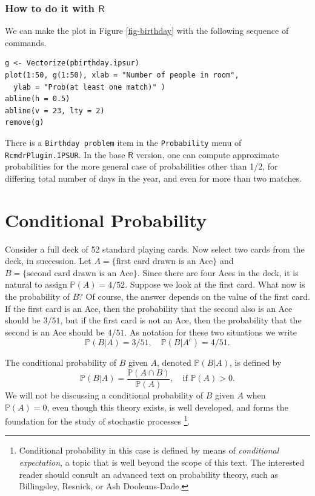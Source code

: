 \documentclass[captions=tableheading]{scrbook}
\begin{document}
\subsubsection{How to do it with \(\mathsf{R}\)}
\label{sec-4-5-2-3}


We can make the plot in Figure \ref{fig-birthday} with the following sequence of commands.


\lstset{language=R}
\begin{lstlisting}
g <- Vectorize(pbirthday.ipsur)
plot(1:50, g(1:50), xlab = "Number of people in room", 
  ylab = "Prob(at least one match)" )
abline(h = 0.5)
abline(v = 23, lty = 2)
remove(g)
\end{lstlisting}

There is a \texttt{Birthday problem} item in the \texttt{Probability} menu of \texttt{RcmdrPlugin.IPSUR}. In the base \(\mathsf{R}\) version, one can compute approximate probabilities for the more general case of probabilities other than 1/2, for differing total number of days in the year, and even for more than two matches.
\section{Conditional Probability}
\label{sec-4-6}
\label{sec-Conditional-Probability}


Consider a full deck of 52 standard playing cards. Now select two cards from the deck, in succession. Let \( A = \{ \mbox{first card drawn is an Ace} \} \) and \( B = \{ \mbox{second card drawn is an Ace} \} \). Since there are four Aces in the deck, it is natural to assign \( \mathbb{P}(A) = 4/52 \). Suppose we look at the first card. What now is the probability of \(B\)? Of course, the answer depends on the value of the first card. If the first card is an Ace, then the probability that the second also is an Ace should be \( 3/51 \), but if the first card is not an Ace, then the probability that the second is an Ace should be \( 4/51 \). As notation for these two situations we write
\[
\mathbb{P}(B|A)=3/51,\quad \mathbb{P}(B|A^{c})=4/51.
\]

\begin{defn}
The conditional probability of \(B\) given \(A\), denoted \(\mathbb{P}(B|A)\), is defined by
\begin{equation}
\mathbb{P}(B|A)=\frac{\mathbb{P}(A\cap B)}{\mathbb{P}(A)},\quad \mbox{if }\mathbb{P}(A)>0.
\end{equation}
We will not be discussing a conditional probability of \(B\) given \(A\) when \(\mathbb{P}(A)=0\), even though this theory exists, is well developed, and forms the foundation for the study of stochastic processes
\footnote{Conditional probability in this case is defined by means of \emph{conditional expectation}, a topic that is well beyond the scope of this text. The interested reader should consult an advanced text on probability theory, such as Billingsley, Resnick, or Ash Dooleans-Dade.}.
\end{defn}
\end{document}
